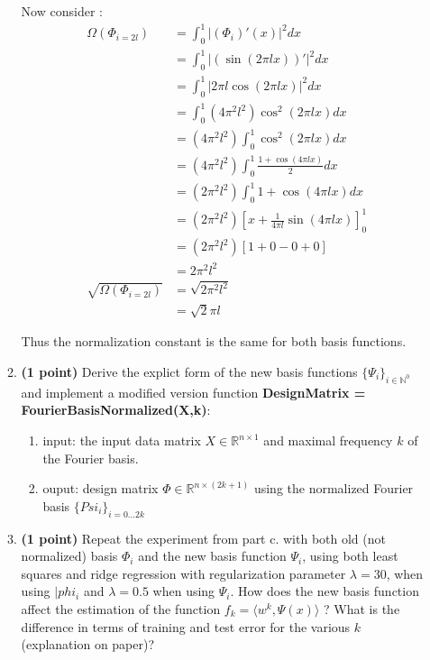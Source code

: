 \documentclass{./tufte-handout}
\begin{document}
\begin{enumerate}[(a)]
\begin{enumerate}
    Now consider : 
    \begin{align}
        \Omega(\Phi_{i=2l}) &= \int_0^1 |(\Phi_i)'(x)|^2 dx \\
            &= \int_0^1 | (\sin(2 \pi l x ))' |^2 dx \\
            &= \int_0^1 | 2 \pi l \cos(2 \pi l x) |^2 dx \\
            &= \int_0^1 (4 \pi^2 l^2) \cos^2(2 \pi l x) dx \\
            &= (4 \pi^2 l^2) \int_0^1  \cos^2(2 \pi l x) dx \\
            &= (4 \pi^2 l^2) \int_0^1  \frac{1 + \cos(4 \pi l x)}{2} dx \\
            &= (2 \pi^2 l^2) \int_0^1  1 + \cos(4 \pi l x) dx \\
            &= (2 \pi^2 l^2) \left[ x + \frac{1}{4 \pi l} \sin(4 \pi l x) \right]_0^1 \\
            &= (2 \pi^2 l^2) \left[ 1 + 0 - 0 + 0 \right] \\
            &= 2 \pi^2 l^2\\
        \sqrt{\Omega(\Phi_{i=2l})} &= \sqrt{2 \pi^2 l^2} \\
            &= \sqrt{2} \pi l
    \end{align} 

    Thus the normalization constant is the same for both basis functions.

    \item \textbf{(1 point)} Derive the explict form of the new basis functions $\{\Psi_i\}_{i \in \mathbb{N}^0}$ and implement a 
    modified version function \textbf{DesignMatrix = FourierBasisNormalized(X,k)}:
    \begin{enumerate}
        \item input: the input data matrix $X \in \mathbb{R}^{n \times 1}$ and maximal frequency $k$ of the Fourier basis.
        \item ouput: design matrix  $\Phi \in \mathbb{R}^{n \times (2k+1)}$ using the normalized Fourier basis $\{Psi_i\}_{i = 0 \dots 2k}$
    \end{enumerate}
    \item \textbf{(1 point)} Repeat the experiment from part c. with both old (not normalized)  basis $\Phi_i$ and 
    the new basis function $\Psi_i$, using both least squares and ridge regression with regularization parameter $\lambda = 30$, when using 
    $|phi_i$ and $\lambda=0.5$ when using $\Psi_i$. How does the new basis function affect the 
    estimation of the function $f_k = \langle w^k, \Psi(x)\rangle$ ? What is the difference in 
    terms of training and test error for the various $k$ (explanation on paper)?
\end{enumerate}



\end{enumerate}
\end{document}

